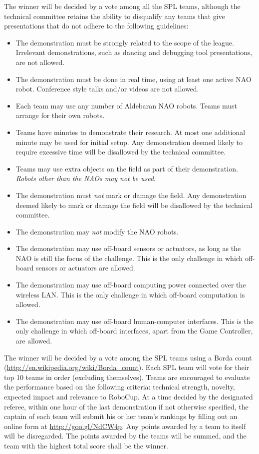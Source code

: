 \documentclass[12pt]{article}
\begin{document}
The winner will be decided by a vote among all the SPL teams, although the technical 
committee retains the ability to disqualify any teams that give presentations that do 
not adhere to the following guidelines:

\begin{itemize}
\item 
The demonstration must be strongly related to the scope of the league. 
Irrelevant demonstrations, such as dancing and debugging tool presentations, 
are not allowed.
\item
The demonstration must be done in real time, using at least one active NAO robot.  Conference style talks and/or videos are not allowed.
\item 
Each team may use any number of Aldebaran NAO robots. Teams must arrange
for their own robots.
\item 
Teams have \openMinNum{} minutes to demonstrate their research. At most one 
additional minute may be used for initial setup. Any demonstration deemed
likely to require excessive time will be disallowed by the technical
committee.
\item 
Teams may use extra objects on the field as part of their
demonstration. \emph{Robots other than the NAOs may not be used}.
\item 
The demonstration must \emph{not} mark or damage the field. Any
demonstration deemed likely to mark or damage the field will be
disallowed by the technical committee.
\item
The demonstration may \emph{not} modify the NAO robots.
\item 
The demonstration may use off-board sensors or actuators, as long 
as the NAO is still the focus of the challenge.  This is the only 
challenge in which off-board sensors or actuators are allowed.
\item 
The demonstration may use off-board computing power connected over the
wireless LAN. This is the only challenge in which off-board
computation is allowed.
\item 
The demonstration may use off-board human-computer interfaces. This
is the only challenge in which off-board interfaces, apart from the
Game Controller, are allowed.
\end{itemize}

The winner will be decided by a vote among the SPL teams using a Borda
count (\url{http://en.wikipedia.org/wiki/Borda_count}). Each SPL 
team will vote for their top 10 teams in order (excluding themselves).
Teams are encouraged to evaluate the performance based on the
following criteria: technical strength, novelty, expected impact and
relevance to RoboCup. At a time decided by the designated referee,
within one hour of the last demonstration if not otherwise
specified, the captain of each team will submit his or her team's rankings 
by filling out an online form at \url{http://goo.gl/NdCW4p}.  Any points 
awarded by a team to itself will be disregarded. The points awarded by the 
teams will be summed, and the team with the highest total score shall be the winner.
\end{document}
